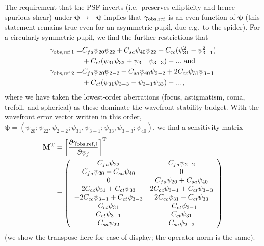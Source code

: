 \documentclass[aps,prd, amsmath,amssymb,superscriptaddress,showkeys,nofootinbib,reprint,preprintnumbers]{revtex4-1}
\begin{document}
The requirement that the PSF inverts (i.e.\ preserves ellipticity and
hence spurious shear) under
${\boldsymbol\psi}\rightarrow-{\boldsymbol\psi}$ implies that
${\boldsymbol\gamma}_{\rm obs,ref}$ is an even function of
${\boldsymbol\psi}$ (this statement remains true even for an
asymmetric pupil, due e.g.\ to the spider). For a circularly symmetric
pupil, we find the further restrictions that
\begin{align}
\gamma_{\rm obs,ref\,1} =& C_{fa} \psi_{20} \psi_{22} + C_{sa} \psi_{40} \psi_{22}
+ C_{cc} (\psi_{31}^2-\psi_{3-1}^2) \nonumber\\
&+ C_{ct} (\psi_{31}\psi_{33} + \psi_{3-1}\psi_{3-3})
+ ...~{\rm and}
\nonumber \\
\gamma_{\rm obs,ref\,2} =& C_{fa} \psi_{20} \psi_{2-2} + C_{sa} \psi_{40} \psi_{2-2}
+ 2C_{cc} \psi_{31} \psi_{3-1} \nonumber\\
&+ C_{ct} (\psi_{31}\psi_{3-3} - \psi_{3-1}\psi_{33})
+ ...\,,
\end{align}
where we have taken the lowest-order aberrations (focus, astigmatism,
coma, trefoil, and spherical) as these dominate the wavefront
stability budget. With the wavefront error vector written in this
order, ${\boldsymbol\psi} = (\psi_{20}; \psi_{22},\psi_{2-2};
\psi_{31},\psi_{3-1}; \psi_{33},\psi_{3-3}; \psi_{40})$, we find a
sensitivity matrix
\begin{align}
{\bf M}^{\rm T} &= \left[ \frac{\partial \gamma_{{\rm obs,ref},i}}{\partial\psi_j} \right]^{\rm T}\nonumber\\
&= \left( \begin{array}{cc}
C_{fa}\psi_{22}  & C_{fa}\psi_{2-2} \\
C_{fa}\psi_{20}+C_{sa}\psi_{40} & 0 \\
0 & C_{fa}\psi_{20}+C_{sa}\psi_{40} \\
2C_{cc}\psi_{31}+C_{ct}\psi_{33} & 2C_{cc}\psi_{3-1}+C_{ct}\psi_{3-3} \\
-2C_{cc}\psi_{3-1}+C_{ct}\psi_{3-3} & 2C_{cc}\psi_{31}-C_{ct}\psi_{33} \\
C_{ct}\psi_{31} & -C_{ct}\psi_{3-1} \\
C_{ct}\psi_{3-1} & C_{ct}\psi_{31} \\
C_{sa}\psi_{22} & C_{sa}\psi_{2-2}
\end{array} \right)
\label{eq:TheMatrix}
\end{align}
(we show the transpose here for ease of display; the operator norm is the same).
\end{document}
